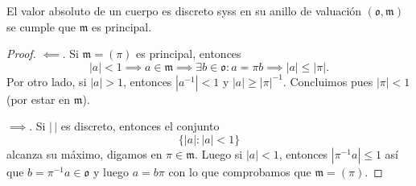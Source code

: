 \documentclass[teoria-numeros.tex]{subfiles}
\begin{document}
\begin{prop}
	El valor absoluto de un cuerpo es discreto syss en su anillo de valuación $(\mathfrak{o}, \mathfrak{m})$ se cumple que $\mathfrak{m}$ es principal.
\end{prop}
\begin{proof}
	$\impliedby$. Si $\mathfrak{m} = (\pi)$ es principal, entonces
	$$ |a| < 1 \implies a \in \mathfrak{m} \implies \exists b \in \mathfrak{o} : a = \pi b \implies |a| \le |\pi|. $$
	Por otro lado, si $|a| > 1$, entonces $|a^{-1}| < 1$ y $|a| \ge |\pi|^{-1}$. Concluimos pues $|\pi| < 1$ (por estar en $\mathfrak{m}$).
	\par
	$\implies$. Si $|\,|$ es discreto, entonces el conjunto
	$$ \{|a| : |a| < 1\} $$
	alcanza su máximo, digamos en $\pi \in \mathfrak{m}$. Luego si $|a| < 1$, entonces $|\pi^{-1}a| \le 1$ así que $b = \pi^{-1}a \in \mathfrak{o}$
	y luego $a = b\pi$ con lo que comprobamos que $\mathfrak{m} = (\pi)$.
\end{proof}
\end{document}

